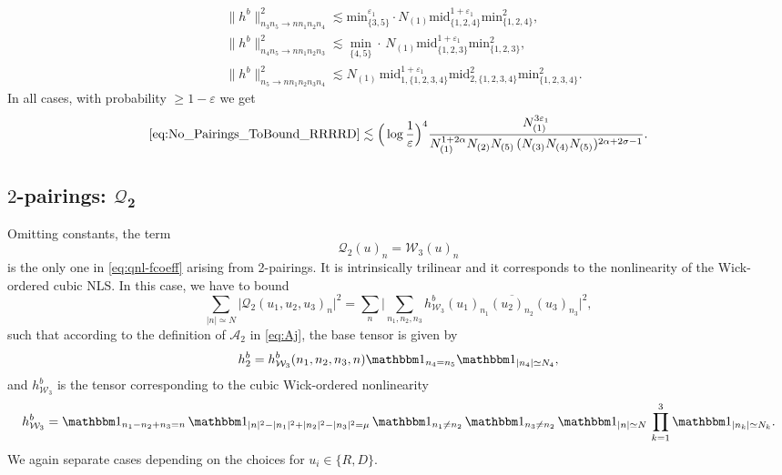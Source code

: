 \documentclass[11pt, xcolor = dvipsnames,reqno
]{amsart}
\theoremstyle{definition}
\theoremstyle{remark}
\begin{document}
\begin{align*}
    & \lVert  h^b \rVert_{n_3n_5 \to nn_1n_2n_4}^2 \lesssim \text{min}_{\{3,5\}}^{\varepsilon_1} \cdot N_{(1)} \text{mid}_{\{1,2,4\}}^{1 + \varepsilon_1} \text{min}_{\{1,2,4\}}^2, \\
    & \lVert  h^b \rVert_{n_4n_5 \to nn_1n_2n_3}^2 \lesssim \operatorname{min}_{\{4,5\}} \cdot  \, N_{(1)} \text{mid}_{\{1,2,3\}}^{1 + \varepsilon_1}  \text{min}_{\{1,2,3\}}^2  , \\
    & \lVert  h^b \rVert_{n_5 \to nn_1n_2n_3n_4}^2 \lesssim  N_{(1)} \,  \text{mid}_{1,\{1,2,3,4\}}^{1 + \varepsilon_1} \text{mid}_{2,\{1,2,3,4\}}^2 \text{min}_{\{1,2,3,4\}}^2 .
    \end{align*}
In all cases, with probability $\geq 1 - \varepsilon$ we get 
\begin{align*}
     \eqref{eq:No_Pairings_ToBound_RRRRD} \lesssim \Big(\log \frac{1}{\varepsilon} \Big)^4 \frac{N_{(1)}^{3\varepsilon_1}}{N_{(1)}^{1 + 2\alpha} N_{(2)} N_{(5)} \,  (N_{(3)}N_{(4)} N_{(5)})^{2\alpha + 2\sigma - 1}}.
\end{align*}



\subsection{$2$-pairings: $\boldsymbol{\mathcal{Q}_2}$}
\label{sec:Two_Pairings}
Omitting constants, the term 
\begin{equation}
        \mathcal{Q}_2(u)_n = 
     \mathcal W_3(u)_n
    \end{equation}
    is the only one in \eqref{eq:qnl-fcoeff}  arising from 2-pairings. It is intrinsically trilinear
    and it corresponds to the nonlinearity of the Wick-ordered cubic NLS. 
    In this case, we have to bound 
    \begin{equation}
    \label{eq:Two_Pairings_ToBound}
        \sum_{|n| \simeq N}  \big| \mathcal{Q}_2(u_1, u_2, u_3)_n \big|^2
        = \sum_n \Big| \sum_{n_1, n_2, n_3} h_{\mathcal W_3}^b (u_1)_{n_1} \overline{(u_2)_{n_2}} (u_3)_{n_3} \Big|^2, 
    \end{equation}
    such that according to the definition of $\mathcal{A}_2$ in \eqref{eq:Aj},
    the base tensor is given by
    \begin{align*}
        h^b_2 
        = h^b_{\mathcal{W}_3}(n_1,n_2,n_3,n)  \mathbbm 1_{n_4 = n_5} \mathbbm 1_{|n_4| \simeq N_4}, 
    \end{align*}
    and $h^b_{\mathcal{W}_3}$ is the tensor corresponding to the cubic Wick-ordered nonlinearity
    \begin{align}\label{eq:Base_Tensor_Wick}
    h^b_{\mathcal{W}_3} 
    =  
    \mathbbm 1_{n_1 - n_2 + n_3 = n} \,  
    \mathbbm 1_{|n|^2 - |n_1|^2 + |n_2|^2 - |n_3|^2 = \mu} \, \mathbbm 1_{n_1 \neq n_2} \,  \mathbbm 1_{n_3 \neq n_2} \,
    \mathbbm 1_{|n| \simeq N} \, 
    \prod_{k=1}^3 \mathbbm 1_{|n_k| \simeq N_k}.
    \end{align}
    We again separate cases depending on the choices for $u_i \in \{ R, D\}$. 
    \hfill \break
\end{document}
